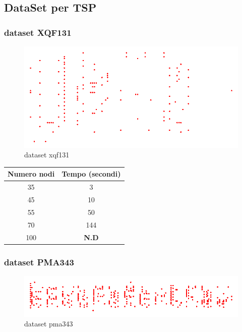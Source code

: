 \documentclass{article}
\begin{document}
\newpage

\subsection{DataSet per TSP}
\label{sec:datasetTSP}
\subsubsection{dataset XQF131}

\begin{figure}[h]
\begin{center}
\includegraphics[scale=0.5]{img/xqf131.png} %
\caption{dataset xqf131}
\end{center}
\end{figure}

\begin{table}[h]
\centering
\begin{tabular}{c | c}
\hline \hline
\textbf{Numero nodi} & \textbf{Tempo (secondi)} \\
\hline
35 & 3 \\
\hline
45 & 10 \\
\hline
55 & 50 \\
\hline
70 & 144 \\
\hline
100 & \textbf{N.D} \\
\hline

\end{tabular}
\end{table}

\newpage
\subsubsection{dataset PMA343}

\begin{figure}[h]
\begin{center}
\includegraphics[scale=0.5]{img/pma343.png} %
\caption{dataset pma343}
\end{center}
\end{figure}
\end{document}
